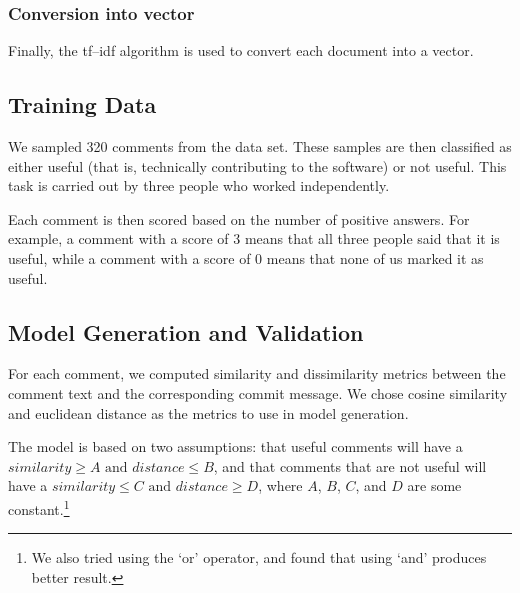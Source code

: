 \documentclass[conference]{IEEEtran}
\begin{document}
\subsubsection{Conversion into vector}

Finally, the tf--idf algorithm is used to convert each document into a vector.


\subsection{Training Data}

We sampled 320 comments from the data set.
These samples are then classified as either useful (that is, technically contributing to the software) or not useful.
This task is carried out by three people who worked independently.

Each comment is then scored based on the number of positive answers.
For example, a comment with a score of 3 means that all three people said that it is useful,
while a comment with a score of 0 means that none of us marked it as useful.



\subsection{Model Generation and Validation}

For each comment, we computed similarity and dissimilarity metrics
between the comment text and the corresponding commit message.
We chose cosine similarity and euclidean distance as the metrics to use in model generation.

The model is based on two assumptions: that useful comments will have a $similarity \geq A \text{ and } distance \leq B$,
and that comments that are not useful will have a $ similarity \leq C \text{ and } distance \geq D$,
where $A$, $B$, $C$, and $D$ are some constant.\footnote{We also tried using the `or' operator, and found that using `and' produces better result.}
\end{document}
